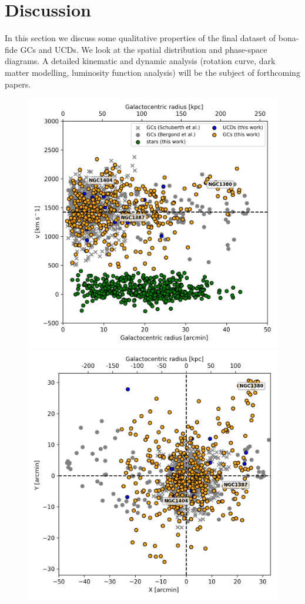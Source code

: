 \documentclass[useAMS,usenatbib]{mn2e}
\begin{document}
\section{Discussion}
\label{sec:discussion}
In this section we discuss some qualitative properties of the final dataset 
of bona-fide GCs and UCDs. We look at the spatial distribution and 
phase-space diagrams. A detailed kinematic and dynamic analysis 
(rotation curve, dark matter modelling, luminosity function analysis) will 
be the subject of forthcoming papers.

\begin{figure}
\centering
\includegraphics[width=\columnwidth]{figures/RV.png} 
\includegraphics[width=\columnwidth]{figures/XY.png} 

\end{figure}
\end{document}
